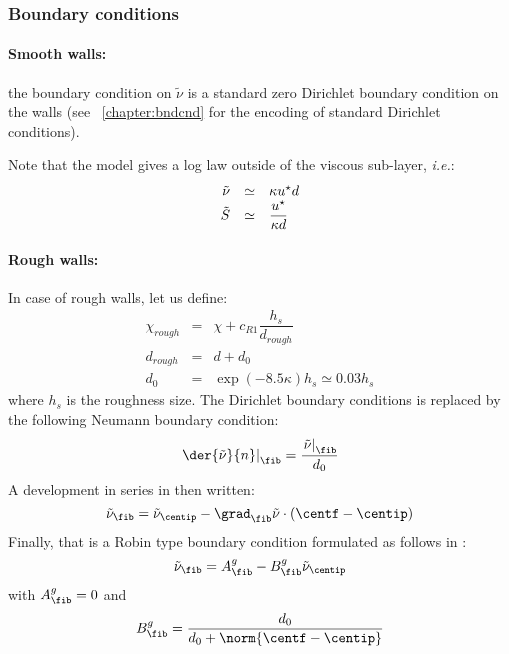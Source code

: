 \subsubsection{Boundary conditions}

\paragraph{Smooth walls:}
the boundary condition on $\tilde{\nu}$ is a standard zero Dirichlet boundary condition on the walls
(see \chaptername~\ref{chapter:bndcnd} for the encoding of standard Dirichlet conditions).

Note that the model gives a log law outside of the viscous sub-layer, \emph{i.e.}:
\begin{equation}
\begin{array}{r c l}
\tilde{\nu} & \simeq & \kappa u^\star d \\
\tilde{S} & \simeq & \dfrac{u^\star}{ \kappa d}
\end{array}
\end{equation}

\paragraph{Rough walls:}
In case of rough walls, let us define:
\begin{equation}
\begin{array}{rcl}
\chi_{rough} & = & \chi + c_{R1} \dfrac{h_s}{d_{rough}} \\
d_{rough} & = & d + d_0 \\
d_0     & = & \exp \left( -8.5 \kappa \right) h_s \simeq 0.03 h_s
\end{array}
\end{equation}
%
where $h_s$ is the roughness size. The Dirichlet boundary conditions
is replaced by the following Neumann boundary condition:
%
\begin{equation}\label{eq:eq_neumann_nu}
\left. \der{\tilde{ \nu}}{n} \right|_\fib = \dfrac{\left. \tilde{ \nu}\right|_\fib }{ d_0}
\end{equation}
%
A development in series in then written:
\begin{equation}\label{eq:eq_neumann_nu_vf}
  \tilde{\nu}_\fib = \tilde{\nu}_{\centip} -   \grad_\fib \tilde{ \nu} \cdot (\centf -\centip)
\end{equation}
Finally, that is a Robin type boundary condition formulated as follows in \CS:
\begin{equation}\label{eq:eq_neumann_nu_coef}
 \tilde{\nu}_\fib = A^g_\fib - B^g_\fib \tilde{\nu}_\centip
\end{equation}
with $A^g_\fib=0$ and
%
\begin{equation}\label{eq:eq_neumann_nu_coefb}
  B^g_\fib = \dfrac{d_0}{d_0 + \norm{\centf - \centip} }
\end{equation}

